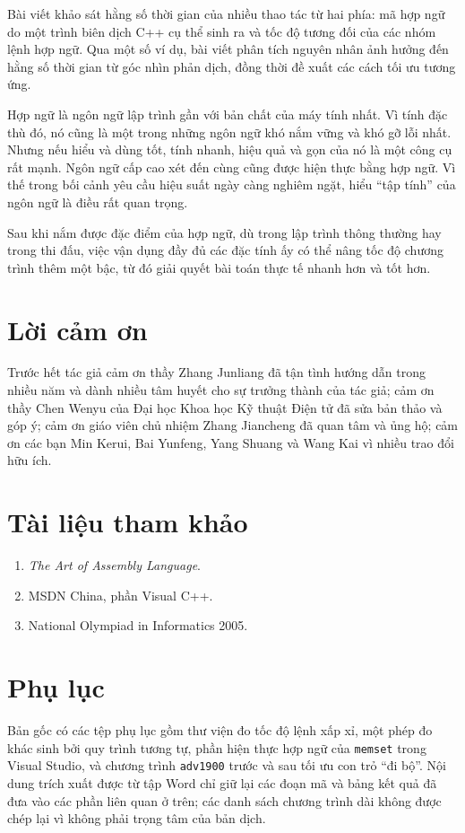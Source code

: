 \documentclass[11pt]{article}
\begin{document}
Bài viết khảo sát hằng số thời gian của nhiều thao tác từ hai phía: mã hợp ngữ
do một trình biên dịch C++ cụ thể sinh ra và tốc độ tương đối của các nhóm
lệnh hợp ngữ. Qua một số ví dụ, bài viết phân tích nguyên nhân ảnh hưởng đến
hằng số thời gian từ góc nhìn phản dịch, đồng thời đề xuất các cách tối ưu
tương ứng.

Hợp ngữ là ngôn ngữ lập trình gần với bản chất của máy tính nhất. Vì tính đặc
thù đó, nó cũng là một trong những ngôn ngữ khó nắm vững và khó gỡ lỗi nhất.
Nhưng nếu hiểu và dùng tốt, tính nhanh, hiệu quả và gọn của nó là một công cụ
rất mạnh. Ngôn ngữ cấp cao xét đến cùng cũng được hiện thực bằng hợp ngữ. Vì
thế trong bối cảnh yêu cầu hiệu suất ngày càng nghiêm ngặt, hiểu ``tập tính''
của ngôn ngữ là điều rất quan trọng.

Sau khi nắm được đặc điểm của hợp ngữ, dù trong lập trình thông thường hay
trong thi đấu, việc vận dụng đầy đủ các đặc tính ấy có thể nâng tốc độ chương
trình thêm một bậc, từ đó giải quyết bài toán thực tế nhanh hơn và tốt hơn.

\section*{Lời cảm ơn}

Trước hết tác giả cảm ơn thầy Zhang Junliang đã tận tình hướng dẫn trong nhiều
năm và dành nhiều tâm huyết cho sự trưởng thành của tác giả; cảm ơn thầy Chen
Wenyu của Đại học Khoa học Kỹ thuật Điện tử đã sửa bản thảo và góp ý; cảm ơn
giáo viên chủ nhiệm Zhang Jiancheng đã quan tâm và ủng hộ; cảm ơn các bạn Min
Kerui, Bai Yunfeng, Yang Shuang và Wang Kai vì nhiều trao đổi hữu ích.

\section*{Tài liệu tham khảo}

\begin{enumerate}
  \item \emph{The Art of Assembly Language}.
  \item MSDN China, phần Visual C++.
  \item National Olympiad in Informatics 2005.
\end{enumerate}

\section*{Phụ lục}

Bản gốc có các tệp phụ lục gồm thư viện đo tốc độ lệnh xấp xỉ, một phép đo
khác sinh bởi quy trình tương tự, phần hiện thực hợp ngữ của \texttt{memset}
trong Visual Studio, và chương trình \texttt{adv1900} trước và sau tối ưu con
trỏ ``đi bộ''. Nội dung trích xuất được từ tập Word chỉ giữ lại các đoạn mã và
bảng kết quả đã đưa vào các phần liên quan ở trên; các danh sách chương trình
dài không được chép lại vì không phải trọng tâm của bản dịch.
\end{document}
